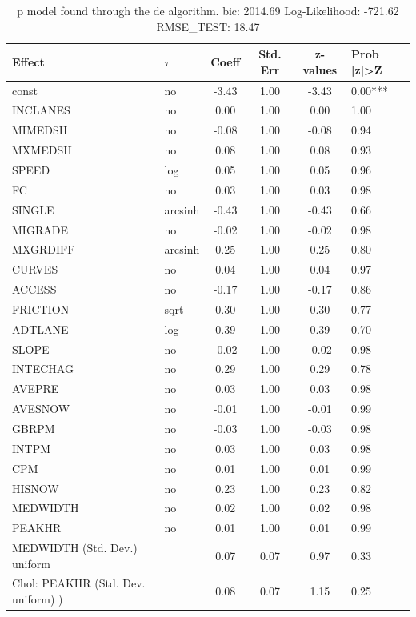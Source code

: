 \begin{table}
	\caption{p model found through the de algorithm. bic: 2014.69 Log-Likelihood: -721.62 RMSE_TEST: 18.47}
	\begin{center}
		\begin{tabular}{|l|l|c|c|c|l|}
			\hline
			Effect & $\tau$ & Coeff & Std. Err & z-values & Prob |z|>Z \\
			\hline
			const & no & -3.43 & 1.00 & -3.43 & 0.00*** \\
			\hline
			INCLANES & no & 0.00 & 1.00 & 0.00 & 1.00 \\
			\hline
			MIMEDSH & no & -0.08 & 1.00 & -0.08 & 0.94 \\
			\hline
			MXMEDSH & no & 0.08 & 1.00 & 0.08 & 0.93 \\
			\hline
			SPEED & log & 0.05 & 1.00 & 0.05 & 0.96 \\
			\hline
			FC & no & 0.03 & 1.00 & 0.03 & 0.98 \\
			\hline
			SINGLE & arcsinh & -0.43 & 1.00 & -0.43 & 0.66 \\
			\hline
			MIGRADE & no & -0.02 & 1.00 & -0.02 & 0.98 \\
			\hline
			MXGRDIFF & arcsinh & 0.25 & 1.00 & 0.25 & 0.80 \\
			\hline
			CURVES & no & 0.04 & 1.00 & 0.04 & 0.97 \\
			\hline
			ACCESS & no & -0.17 & 1.00 & -0.17 & 0.86 \\
			\hline
			FRICTION & sqrt & 0.30 & 1.00 & 0.30 & 0.77 \\
			\hline
			ADTLANE & log & 0.39 & 1.00 & 0.39 & 0.70 \\
			\hline
			SLOPE & no & -0.02 & 1.00 & -0.02 & 0.98 \\
			\hline
			INTECHAG & no & 0.29 & 1.00 & 0.29 & 0.78 \\
			\hline
			AVEPRE & no & 0.03 & 1.00 & 0.03 & 0.98 \\
			\hline
			AVESNOW & no & -0.01 & 1.00 & -0.01 & 0.99 \\
			\hline
			GBRPM & no & -0.03 & 1.00 & -0.03 & 0.98 \\
			\hline
			INTPM & no & 0.03 & 1.00 & 0.03 & 0.98 \\
			\hline
			CPM & no & 0.01 & 1.00 & 0.01 & 0.99 \\
			\hline
			HISNOW & no & 0.23 & 1.00 & 0.23 & 0.82 \\
			\hline
			MEDWIDTH & no & 0.02 & 1.00 & 0.02 & 0.98 \\
			\hline
			PEAKHR & no & 0.01 & 1.00 & 0.01 & 0.99 \\
			\hline
			MEDWIDTH (Std. Dev.) uniform &  & 0.07 & 0.07 & 0.97 & 0.33 \\
			\hline
			 Chol: PEAKHR (Std. Dev. uniform) ) &  & 0.08 & 0.07 & 1.15 & 0.25 \\
			\hline
		\end{tabular}
	\end{center}
\end{table}
